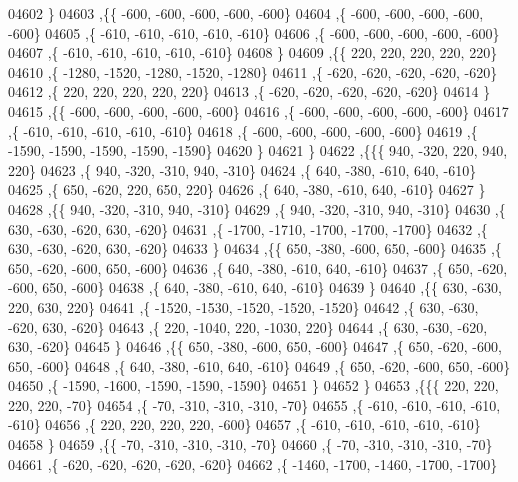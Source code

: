 \begin{DoxyCode}
04602     \}
04603    ,\{\{  -600,  -600,  -600,  -600,  -600\}
04604     ,\{  -600,  -600,  -600,  -600,  -600\}
04605     ,\{  -610,  -610,  -610,  -610,  -610\}
04606     ,\{  -600,  -600,  -600,  -600,  -600\}
04607     ,\{  -610,  -610,  -610,  -610,  -610\}
04608     \}
04609    ,\{\{   220,   220,   220,   220,   220\}
04610     ,\{ -1280, -1520, -1280, -1520, -1280\}
04611     ,\{  -620,  -620,  -620,  -620,  -620\}
04612     ,\{   220,   220,   220,   220,   220\}
04613     ,\{  -620,  -620,  -620,  -620,  -620\}
04614     \}
04615    ,\{\{  -600,  -600,  -600,  -600,  -600\}
04616     ,\{  -600,  -600,  -600,  -600,  -600\}
04617     ,\{  -610,  -610,  -610,  -610,  -610\}
04618     ,\{  -600,  -600,  -600,  -600,  -600\}
04619     ,\{ -1590, -1590, -1590, -1590, -1590\}
04620     \}
04621    \}
04622   ,\{\{\{   940,  -320,   220,   940,   220\}
04623     ,\{   940,  -320,  -310,   940,  -310\}
04624     ,\{   640,  -380,  -610,   640,  -610\}
04625     ,\{   650,  -620,   220,   650,   220\}
04626     ,\{   640,  -380,  -610,   640,  -610\}
04627     \}
04628    ,\{\{   940,  -320,  -310,   940,  -310\}
04629     ,\{   940,  -320,  -310,   940,  -310\}
04630     ,\{   630,  -630,  -620,   630,  -620\}
04631     ,\{ -1700, -1710, -1700, -1700, -1700\}
04632     ,\{   630,  -630,  -620,   630,  -620\}
04633     \}
04634    ,\{\{   650,  -380,  -600,   650,  -600\}
04635     ,\{   650,  -620,  -600,   650,  -600\}
04636     ,\{   640,  -380,  -610,   640,  -610\}
04637     ,\{   650,  -620,  -600,   650,  -600\}
04638     ,\{   640,  -380,  -610,   640,  -610\}
04639     \}
04640    ,\{\{   630,  -630,   220,   630,   220\}
04641     ,\{ -1520, -1530, -1520, -1520, -1520\}
04642     ,\{   630,  -630,  -620,   630,  -620\}
04643     ,\{   220, -1040,   220, -1030,   220\}
04644     ,\{   630,  -630,  -620,   630,  -620\}
04645     \}
04646    ,\{\{   650,  -380,  -600,   650,  -600\}
04647     ,\{   650,  -620,  -600,   650,  -600\}
04648     ,\{   640,  -380,  -610,   640,  -610\}
04649     ,\{   650,  -620,  -600,   650,  -600\}
04650     ,\{ -1590, -1600, -1590, -1590, -1590\}
04651     \}
04652    \}
04653   ,\{\{\{   220,   220,   220,   220,   -70\}
04654     ,\{   -70,  -310,  -310,  -310,   -70\}
04655     ,\{  -610,  -610,  -610,  -610,  -610\}
04656     ,\{   220,   220,   220,   220,  -600\}
04657     ,\{  -610,  -610,  -610,  -610,  -610\}
04658     \}
04659    ,\{\{   -70,  -310,  -310,  -310,   -70\}
04660     ,\{   -70,  -310,  -310,  -310,   -70\}
04661     ,\{  -620,  -620,  -620,  -620,  -620\}
04662     ,\{ -1460, -1700, -1460, -1700, -1700\}

\end{DoxyCode}
